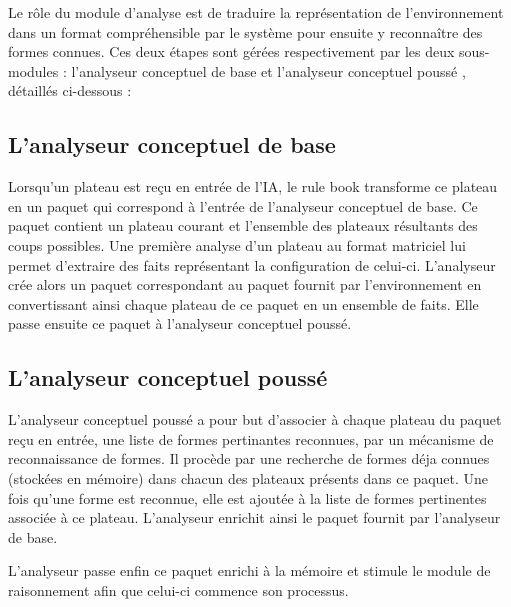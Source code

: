 Le rôle du module d'analyse est de traduire la représentation de l'environnement dans un format compréhensible par le système pour ensuite y reconnaître des formes connues. Ces deux étapes sont gérées respectivement par les deux sous-modules : \og l'analyseur conceptuel de base \fg{} et \og l'analyseur conceptuel poussé \fg{}, détaillés ci-dessous :
\subsection{L'analyseur conceptuel de base}\label{def:analyseur de base}
Lorsqu'un plateau est reçu en entrée de l'IA, le \og rule book \fg{} transforme ce plateau en un paquet qui correspond à l'entrée de l'analyseur conceptuel de base. Ce paquet contient un plateau courant et l'ensemble des plateaux résultants des coups possibles. Une première analyse d'un plateau au format matriciel lui permet d'extraire des faits représentant la configuration de celui-ci. L'analyseur crée alors un paquet correspondant au paquet fournit par l'environnement en convertissant ainsi chaque plateau de ce paquet en un ensemble de faits. Elle passe ensuite ce paquet à l'analyseur conceptuel poussé. 
\subsection{L'analyseur conceptuel poussé}\label{def:analyseur pousse}
L'analyseur conceptuel poussé a pour but d'associer à chaque plateau du paquet reçu en entrée, une liste de formes pertinantes reconnues, par un mécanisme de reconnaissance de formes. Il procède par une recherche de formes déja connues (stockées en mémoire) dans chacun des plateaux présents dans ce paquet. Une fois qu'une forme est reconnue, elle est ajoutée à la liste de formes pertinentes associée à ce plateau. L'analyseur enrichit ainsi le paquet fournit par l'analyseur de base.

L'analyseur passe enfin ce paquet enrichi à la mémoire et stimule le module de raisonnement afin que celui-ci commence son processus. 